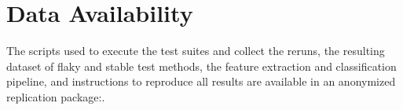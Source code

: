 \documentclass[10pt,conference]{IEEEtran}
\begin{document}


















\section*{Data Availability}
The scripts used to execute the test suites and collect the reruns, the
resulting dataset of flaky and stable test methods, the feature extraction
and classification pipeline, and instructions to reproduce all results are
available in an anonymized replication package:. 



\end{document}
